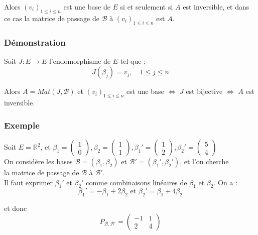 \documentclass[a4paper,10pt]{book} %
\newcommand{\R}{\mathbb{R}}
\newcommand{\B}{\mathcal{B}}
\begin{document}
Alors $(v_i)_{1\leq i\leq n}$ est une base de $E$ si et seulement si $A$ est inversible, et dans ce cas la matrice de passage de $\B$ à $(v_i)_{1\leq i\leq n}$ est $A$.

\subsubsection{Démonstration}
Soit $J:E\rightarrow E$ l'endomorphisme de $E$ tel que :
$$J(\beta_{j})=v_j,\hspace{1em} 1\leq j \leq n$$

Alors $A=Mat(J,\B)$ et $(v_i)_{1\leq i\leq n}$ est une base $\Leftrightarrow$ $J$ est bijective $\Leftrightarrow$ $A$ est inversible.\\

\subsubsection{Exemple}
Soit $E=\R^2$, et
$\beta_{1}=\begin{pmatrix} 1 \\ 0 \end{pmatrix},
\beta_{2}=\begin{pmatrix} 1 \\ 1 \end{pmatrix},
\beta_{1}'=\begin{pmatrix} 1 \\ 2 \end{pmatrix},
\beta_{2}'=\begin{pmatrix} 5 \\ 4 \end{pmatrix}$\\

On considère les bases $\B=(\beta_{1},\beta_{2})$ et $\B'=(\beta_{1}',\beta_2')$, et l'on cherche\\
la matrice de passage de $\B$ à $\B'$. \\

Il faut exprimer $\beta_{1}'$ et $\beta_{2}'$ comme combinaisons linéaires de $\beta_{1}$ et $\beta_{2}$. On a :
$$\beta_{1}'=-\beta_{1}+2\beta_{2} \text{ et } \beta_{2}'=\beta_{1}+4\beta_{2}$$

et donc
$$P_{\B,\B'}=\begin{pmatrix} -1 & 1 \\ 2 & 4 \end{pmatrix}$$
\end{document}
